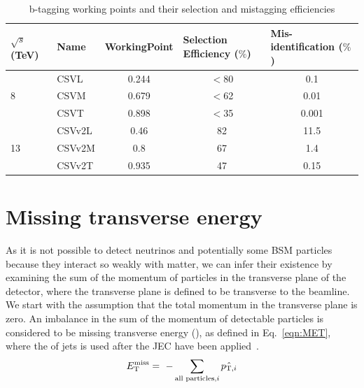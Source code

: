 \begin{table}[htpb!]
\footnotesize
\begin{center}
\begin{tabular}{l|l|c|c|c}
$\sqrt{s}$ (TeV)    & Name   & \multicolumn{1}{l|}{WorkingPoint} & \multicolumn{1}{l|}{Selection Efficiency ($\%$)} & \multicolumn{1}{l}{Mis-identification ($\%$)} \\ \hline
\multirow{3}{*}{8}  & CSVL   & 0.244                             & $<$80                                                 & 0.1                                               \\ \cline{2-5} 
                    & CSVM   & 0.679                             & $<$62                                                 & 0.01                                   \\ \cline{2-5} 
                    & CSVT   & 0.898                             & $<$35                                               & 0.001                                               \\ \hline
\multirow{3}{*}{13} & CSVv2L & 0.46                              & 82                                               & 11.5                                          \\ \cline{2-5} 
                    & CSVv2M & 0.8                               & 67                                               & 1.4                                           \\ \cline{2-5} 
                    & CSVv2T & 0.935                             & 47                                               & 0.15                                         
\end{tabular}
\caption{b-tagging working points and their selection and mistagging efficiencies}
\label{tab:btag}
\end{center}
\end{table}


\section{Missing transverse energy ~\label{sec:METreco}}
As it is not possible to detect neutrinos and potentially some BSM particles because they interact so weakly with matter, we can infer their existence by examining the sum of the momentum of particles in the transverse plane of the detector, where the transverse plane is defined to be transverse to the beamline. We start with the assumption that the total momentum in the transverse plane is zero. An imbalance in the sum of the momentum of detectable particles is considered to be missing transverse energy (\ETmiss), as defined in Eq.~\ref{eqn:MET}, where the \pt of jets is used after the JEC have been applied~\cite{CMS:2016ljj}.
\begin{equation}
E_{\mathrm{T}}^{\text{miss}} = ~- \sum_{\textrm{all particles,}i} \hat{ {p}_{\textrm{T},i} }
\label{eqn:MET}
\end{equation}

